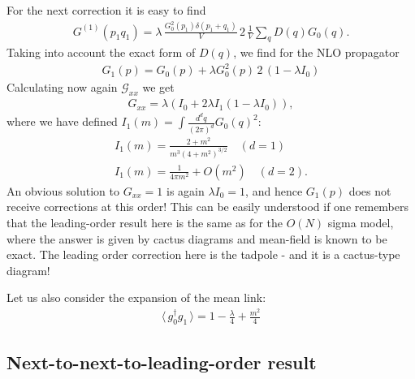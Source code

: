 \documentclass[12pt]{article}
\newcommand{\lr}[1]{ \left( #1 \right) }
\newcommand{\vev}[1]{ \langle \, #1 \, \rangle }
\newcommand{\G}{\mathcal{G}}
\begin{document}
 For the next correction it is easy to find
\begin{eqnarray}
\label{nlo_Gpq}
 G^{\lr{1}}\lr{p_1 q_1} = \lambda \, \frac{G_0^2\lr{p_1} \delta\lr{p_1 + q_1}}{V}
 \, 2 \, \frac{1}{V} \sum\limits_q D\lr{q} G_0\lr{q} .
\end{eqnarray}
Taking into account the exact form of $D\lr{q}$, we find for the NLO propagator
\begin{eqnarray}
\label{nlo_Gpq}
 G_1\lr{p} = G_0\lr{p} + \lambda G_0^2\lr{p} \, 2 \, \lr{1 - \lambda I_0}
\end{eqnarray}
Calculating now again $\G_{xx}$ we get
\begin{eqnarray}
\label{nlo_Gxx}
 G_{xx} = \lambda \lr{I_0 + 2 \lambda I_1 \lr{1 - \lambda I_0}} ,
\end{eqnarray}
where we have defined $I_1\lr{m} = \int \frac{d^d q}{\lr{2 \pi}^d} G_0\lr{q}^2$:
\begin{eqnarray}
\label{lattice_I1_1D}
  I_1\lr{m} = \frac{2 + m^2}{m^3 \lr{4 + m^2}^{3/2}} \quad (d = 1)
 \nonumber \\
\label{lattice_I0_2D}
 I_1\lr{m} = \frac{1}{4 \pi m^2} + O\lr{m^2} \quad (d = 2) .
\end{eqnarray}
An obvious solution to $G_{xx} = 1$ is again $\lambda I_0 = 1$, and hence $G_1\lr{p}$ does not receive corrections at this order! This can be easily understood if one remembers that the leading-order result here is the same as for the $O\lr{N}$ sigma model, where the answer is given by cactus diagrams and mean-field is known to be exact. The leading order correction here is the tadpole - and it is a cactus-type diagram!

 Let us also consider the expansion of the mean link:
\begin{eqnarray}
\label{mean_link_lo}
 \vev{g^{\dag}_0 g_1} = 1 - \frac{\lambda}{4} + \frac{m^2}{4}
\end{eqnarray}

\subsection*{Next-to-next-to-leading-order result}
\end{document}

